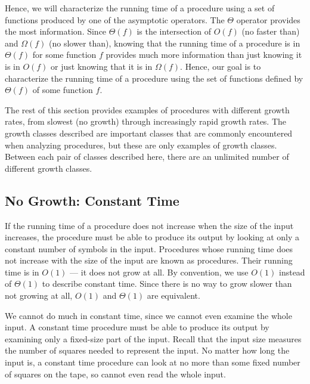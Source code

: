 \begin{schemeregion}
Hence, we will characterize the running time of a procedure using a set of functions produced by one of the asymptotic operators.  The $\Theta$ operator provides the most information.  Since $\Theta(f)$ is the intersection of $O(f)$ (no faster than) and $\Omega(f)$ (no slower than), knowing that the running time of a procedure is in $\Theta(f)$ for some function $f$ provides much more information than just knowing it is in $O(f)$ or just knowing that it is in $\Omega(f)$.  Hence, our goal is to characterize the running time of a procedure using the set of functions defined by $\Theta(f)$ of some function $f$.  

The rest of this section provides examples of procedures with different growth rates, from slowest (no growth) through increasingly rapid growth rates.  The growth classes described are important classes that are commonly encountered when analyzing procedures, but these are only examples of growth classes.  Between each pair of classes described here, there are an unlimited number of different growth classes.

\subsection{No Growth: Constant Time}\label{sec:no-growth}\label{sec:constant-time}

If the running time of a procedure does not increase when the size of the input increases, the procedure must be able to produce its output by looking at only a constant number of symbols in the input.  Procedures whose running time does not increase with the size of the input are known as  procedures.  Their running time is in $O(1)$ --- it does not grow at all.  By convention, we use $O(1)$ instead of $\Theta(1)$ to describe constant time.  Since there is no way to grow slower than not growing at all, $O(1)$ and $\Theta(1)$ are equivalent.

We cannot do much in constant time, since we cannot even examine the whole input.  A constant time procedure must be able to produce its output by examining only a fixed-size part of the input.  Recall that the input size measures the number of squares needed to represent the input.  No matter how long the input is, a constant time procedure can look at no more than some fixed number of squares on the tape, so cannot even read the whole input.


\end{schemeregion}
